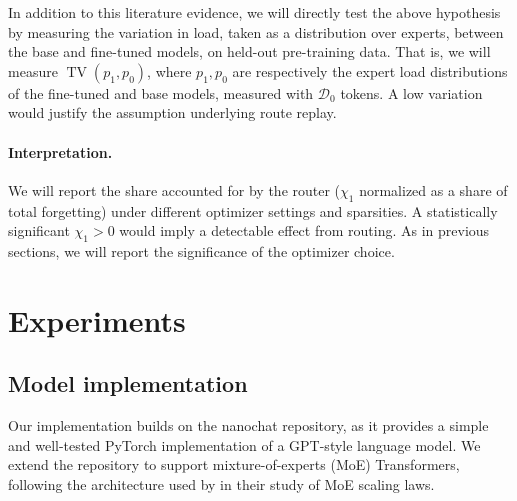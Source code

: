\documentclass[11pt,a4paper]{article}
\newcommand{\D}{\mathcal{D}}
\begin{document}

In addition to this literature evidence, we will directly test the above hypothesis by measuring the variation in load, taken as a distribution over experts, between the base and fine-tuned models, on held-out pre-training data. That is, we will measure $\operatorname{TV}(p_1, p_0)$, where $p_1, p_0$ are respectively the expert load distributions of the fine-tuned and base models, measured with $\D_0$ tokens. A low variation would justify the assumption underlying route replay.

\paragraph{Interpretation.} We will report the share accounted for by the router ($\chi_1$ normalized as a share of total forgetting) under different optimizer settings and sparsities. A statistically significant $\chi_1 > 0$ would imply a detectable effect from routing. As in previous sections, we will report the significance of the optimizer choice.









\section{Experiments}
\label{sec:experiments}

\subsection{Model implementation}
\label{sec:model-implementation}
Our implementation builds on the nanochat \cite{karpathy2025nanochat} repository, as it provides a simple and well-tested PyTorch implementation of a GPT-style language model. We extend the repository to support mixture-of-experts (MoE) Transformers, following the architecture used by \cite{ludziejewski2025jointmoescalinglaws} in their study of MoE scaling laws.
\end{document}
